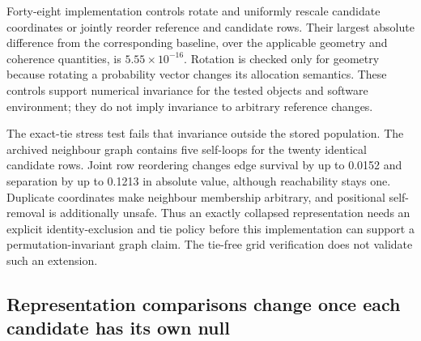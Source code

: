 \documentclass[11pt]{article}
\begin{document}
Forty-eight implementation controls rotate and uniformly rescale candidate coordinates or jointly reorder reference and candidate rows. Their largest absolute difference from the corresponding baseline, over the applicable geometry and coherence quantities, is $5.55\times10^{-16}$. Rotation is checked only for geometry because rotating a probability vector changes its allocation semantics. These controls support numerical invariance for the tested objects and software environment; they do not imply invariance to arbitrary reference changes.

The exact-tie stress test fails that invariance outside the stored population. The archived neighbour graph contains five self-loops for the twenty identical candidate rows. Joint row reordering changes edge survival by up to 0.0152 and separation by up to 0.1213 in absolute value, although reachability stays one. Duplicate coordinates make neighbour membership arbitrary, and positional self-removal is additionally unsafe. Thus an exactly collapsed representation needs an explicit identity-exclusion and tie policy before this implementation can support a permutation-invariant graph claim. The tie-free grid verification does not validate such an extension.

\subsection{Representation comparisons change once each candidate has its own null}
\end{document}
